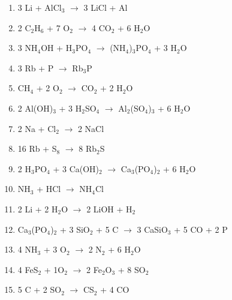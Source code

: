 \documentclass[border=5mm]{standalone}
\begin{document}
\begin{minipage}{\textwidth}
\begin{enumerate}
    \item 3 Li + AlCl$_3$ $\rightarrow$ 3 LiCl + Al
    \item 2 C$_2$H$_6$ + 7 O$_2$ $\rightarrow$ 4 CO$_2$ + 6 H$_2$O
    \item 3 NH$_4$OH + H$_3$PO$_4$ $\rightarrow$ (NH$_4$)$_3$PO$_4$ + 3 H$_2$O
    \item 3 Rb + P $\rightarrow$ Rb$_3$P
    \item CH$_4$ + 2 O$_2$ $\rightarrow$ CO$_2$ + 2 H$_2$O
    \item 2 Al(OH)$_3$ + 3 H$_2$SO$_4$ $\rightarrow$ Al$_2$(SO$_4$)$_3$ + 6 H$_2$O
    \item 2 Na + Cl$_2$ $\rightarrow$ 2 NaCl
    \item 16 Rb + S$_8$ $\rightarrow$ 8 Rb$_2$S
    \item 2 H$_3$PO$_4$ + 3 Ca(OH)$_2$ $\rightarrow$ Ca$_3$(PO$_4$)$_2$ + 6 H$_2$O
    \item NH$_3$ + HCl $\rightarrow$ NH$_4$Cl
    \item 2 Li + 2 H$_2$O $\rightarrow$ 2 LiOH + H$_2$
    \item Ca$_3$(PO$_4$)$_2$ + 3 SiO$_2$ + 5 C $\rightarrow$ 3 CaSiO$_3$ + 5 CO + 2 P
    \item 4 NH$_3$ + 3 O$_2$ $\rightarrow$ 2 N$_2$ + 6 H$_2$O
    \item 4 FeS$_2$ + 1O$_2$ $\rightarrow$ 2 Fe$_2$O$_3$ + 8 SO$_2$
    \item 5 C + 2 SO$_2$ $\rightarrow$ CS$_2$ + 4 CO
\end{enumerate}

\end{minipage}
\end{document}

